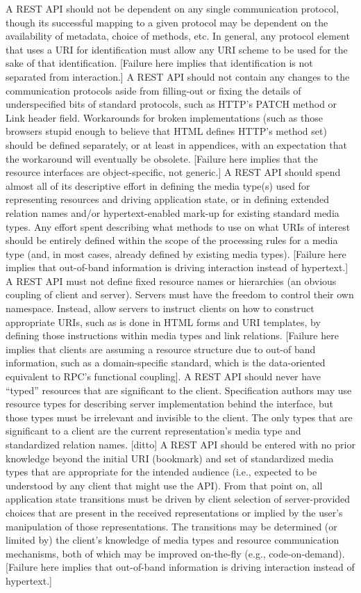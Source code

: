 A REST API should not be dependent on any single communication protocol, though its successful mapping to a given protocol may be dependent on the availability of metadata, choice of methods, etc. In general, any protocol element that uses a URI for identification must allow any URI scheme to be used for the sake of that identification. [Failure here implies that identification is not separated from interaction.]
A REST API should not contain any changes to the communication protocols aside from filling-out or fixing the details of underspecified bits of standard protocols, such as HTTP’s PATCH method or Link header field. Workarounds for broken implementations (such as those browsers stupid enough to believe that HTML defines HTTP’s method set) should be defined separately, or at least in appendices, with an expectation that the workaround will eventually be obsolete. [Failure here implies that the resource interfaces are object-specific, not generic.]
A REST API should spend almost all of its descriptive effort in defining the media type(s) used for representing resources and driving application state, or in defining extended relation names and/or hypertext-enabled mark-up for existing standard media types. Any effort spent describing what methods to use on what URIs of interest should be entirely defined within the scope of the processing rules for a media type (and, in most cases, already defined by existing media types). [Failure here implies that out-of-band information is driving interaction instead of hypertext.]
A REST API must not define fixed resource names or hierarchies (an obvious coupling of client and server). Servers must have the freedom to control their own namespace. Instead, allow servers to instruct clients on how to construct appropriate URIs, such as is done in HTML forms and URI templates, by defining those instructions within media types and link relations. [Failure here implies that clients are assuming a resource structure due to out-of band information, such as a domain-specific standard, which is the data-oriented equivalent to RPC's functional coupling].
A REST API should never have “typed” resources that are significant to the client. Specification authors may use resource types for describing server implementation behind the interface, but those types must be irrelevant and invisible to the client. The only types that are significant to a client are the current representation’s media type and standardized relation names. [ditto]
A REST API should be entered with no prior knowledge beyond the initial URI (bookmark) and set of standardized media types that are appropriate for the intended audience (i.e., expected to be understood by any client that might use the API). From that point on, all application state transitions must be driven by client selection of server-provided choices that are present in the received representations or implied by the user’s manipulation of those representations. The transitions may be determined (or limited by) the client’s knowledge of media types and resource communication mechanisms, both of which may be improved on-the-fly (e.g., code-on-demand). [Failure here implies that out-of-band information is driving interaction instead of hypertext.]


